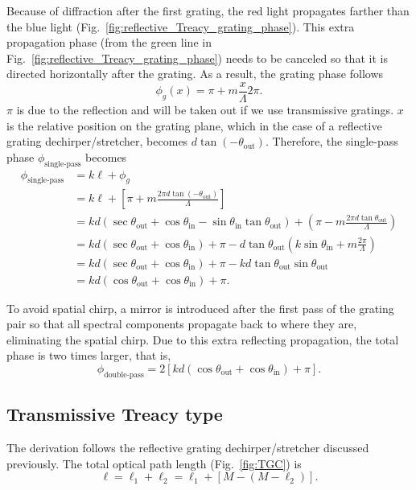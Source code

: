 \documentclass[12pt,hidelinks]{book}
\begin{document}
Because of diffraction after the first grating, the red light propagates farther than the blue light (Fig.~\ref{fig:reflective_Treacy_grating_phase}). This extra propagation phase (from the green line in Fig.~\ref{fig:reflective_Treacy_grating_phase}) needs to be canceled so that it is directed horizontally after the grating. As a result, the grating phase follows
\begin{equation}
\phi_g(x)=\pi+m\frac{x}{\Lambda}2\pi.
\end{equation}
$\pi$ is due to the reflection and will be taken out if we use transmissive gratings. $x$ is the relative position on the grating plane, which in the case of a reflective grating dechirper/stretcher, becomes $d\tan(-\theta_{\text{out}})$. Therefore, the single-pass phase $\phi_{\text{single-pass}}$ becomes
\begin{align}
\phi_{\text{single-pass}} & =k\ell+\phi_g \nonumber \\
& =k\ell+\left[\pi+m\frac{2\pi d\tan(-\theta_{\text{out}})}{\Lambda}\right] \nonumber \\
& =kd\left(\sec\theta_{\text{out}}+\cos\theta_{\text{in}}-\sin\theta_{\text{in}}\tan\theta_{\text{out}}\right)+\left(\pi-m\frac{2\pi d\tan\theta_{\text{out}}}{\Lambda}\right) \nonumber \\
& =kd\left(\sec\theta_{\text{out}}+\cos\theta_{\text{in}}\right)+\pi-d\tan\theta_{\text{out}}\left(k\sin\theta_{\text{in}}+m\frac{2\pi}{\Lambda}\right) \nonumber \\
& =kd\left(\sec\theta_{\text{out}}+\cos\theta_{\text{in}}\right)+\pi-kd\tan\theta_{\text{out}}\sin\theta_{\text{out}} \nonumber \\
& =kd\left(\cos\theta_{\text{out}}+\cos\theta_{\text{in}}\right)+\pi.
\end{align}

To avoid spatial chirp, a mirror is introduced after the first pass of the grating pair so that all spectral components propagate back to where they are, eliminating the spatial chirp. Due to this extra reflecting propagation, the total phase is two times larger, that is,
\begin{equation}
\phi_{\text{double-pass}}=2\left[kd\left(\cos\theta_{\text{out}}+\cos\theta_{\text{in}}\right)+\pi\right].
\end{equation}

\subsection{Transmissive Treacy type}
The derivation follows the reflective grating dechirper/stretcher discussed previously. The total optical path length (Fig.~\ref{fig:TGC}) is
\begin{equation}
\ell=\ell_1+\ell_2=\ell_1+\left[M-\left(M-\ell_2\right)\right].
\end{equation}
\end{document}
